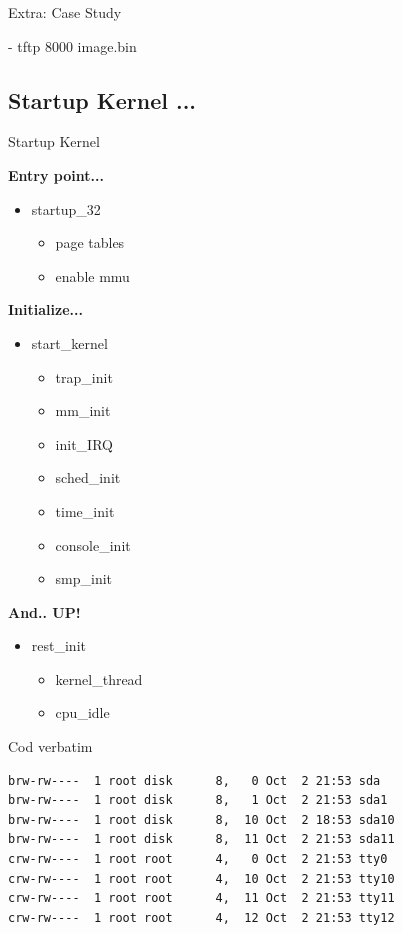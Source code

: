 \documentclass{workshop}
\begin{document}
\begin{frame}{Extra: Case Study}
\begin{figure}
      \end{figure}
      \begin{center}
      \tiny{- tftp 8000 image.bin}
      \end{center}
\end{frame}


\subsection{Startup Kernel ...}

\begin{frame}{Startup Kernel}

\textbf{Entry point...}\\
\begin{itemize}
\item startup\_32
\begin{itemize}
\item page tables
\item enable mmu
\end{itemize}
\end{itemize}

\textbf{Initialize...}\\
\begin{itemize}
\item start\_kernel
\begin{itemize}
\item trap\_init
\item mm\_init
\item init\_IRQ
\item sched\_init
\item time\_init
\item console\_init
\item smp\_init
\end{itemize}
\end{itemize}

\textbf{And.. UP!}\\
\begin{itemize}
\item rest\_init
\begin{itemize}
\item kernel\_thread
\item cpu\_idle
\end{itemize}
\end{itemize}
\end{frame}

\begin{frame}[fragile]{Cod verbatim}
  \pause
  \footnotesize
  \begin{verbatim}
brw-rw----  1 root disk      8,   0 Oct  2 21:53 sda
brw-rw----  1 root disk      8,   1 Oct  2 21:53 sda1
brw-rw----  1 root disk      8,  10 Oct  2 18:53 sda10
brw-rw----  1 root disk      8,  11 Oct  2 21:53 sda11
crw-rw----  1 root root      4,   0 Oct  2 21:53 tty0
crw-rw----  1 root root      4,  10 Oct  2 21:53 tty10
crw-rw----  1 root root      4,  11 Oct  2 21:53 tty11
crw-rw----  1 root root      4,  12 Oct  2 21:53 tty12
  \end{verbatim}
\end{frame}
\end{document}
